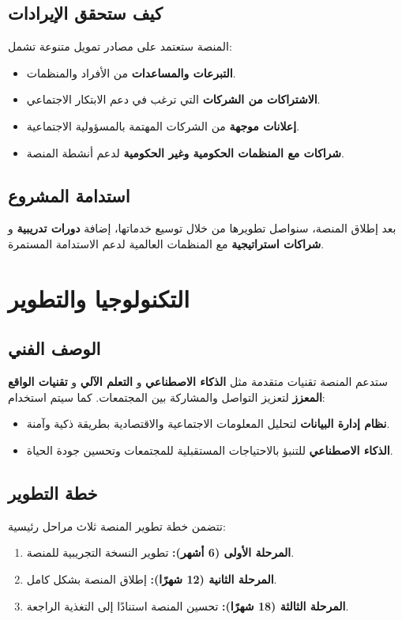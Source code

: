 \documentclass[12pt]{article}
\begin{document}
\subsection*{\textcolor{sectionColor}{كيف ستحقق الإيرادات}}
المنصة ستعتمد على مصادر تمويل متنوعة تشمل:
\begin{itemize}
    \item \textbf{التبرعات والمساعدات} من الأفراد والمنظمات.
    \item \textbf{الاشتراكات من الشركات} التي ترغب في دعم الابتكار الاجتماعي.
    \item \textbf{إعلانات موجهة} من الشركات المهتمة بالمسؤولية الاجتماعية.
    \item \textbf{شراكات مع المنظمات الحكومية وغير الحكومية} لدعم أنشطة المنصة.
\end{itemize}

\subsection*{\textcolor{sectionColor}{استدامة المشروع}}
بعد إطلاق المنصة، سنواصل تطويرها من خلال توسيع خدماتها، إضافة \textbf{دورات تدريبية} و \textbf{شراكات استراتيجية} مع المنظمات العالمية لدعم الاستدامة المستمرة.

\section{\textcolor{sectionColor}{التكنولوجيا والتطوير}}
\subsection*{\textcolor{sectionColor}{الوصف الفني}}
ستدعم المنصة تقنيات متقدمة مثل \textbf{الذكاء الاصطناعي} و \textbf{التعلم الآلي} و \textbf{تقنيات الواقع المعزز} لتعزيز التواصل والمشاركة بين المجتمعات. كما سيتم استخدام:
\begin{itemize}
    \item \textbf{نظام إدارة البيانات} لتحليل المعلومات الاجتماعية والاقتصادية بطريقة ذكية وآمنة.
    \item \textbf{الذكاء الاصطناعي} للتنبؤ بالاحتياجات المستقبلية للمجتمعات وتحسين جودة الحياة.
\end{itemize}

\subsection*{\textcolor{sectionColor}{خطة التطوير}}
تتضمن خطة تطوير المنصة ثلاث مراحل رئيسية:
\begin{enumerate}
    \item \textbf{المرحلة الأولى (6 أشهر):} تطوير النسخة التجريبية للمنصة.
    \item \textbf{المرحلة الثانية (12 شهرًا):} إطلاق المنصة بشكل كامل.
    \item \textbf{المرحلة الثالثة (18 شهرًا):} تحسين المنصة استنادًا إلى التغذية الراجعة.
\end{enumerate}
\end{document}
